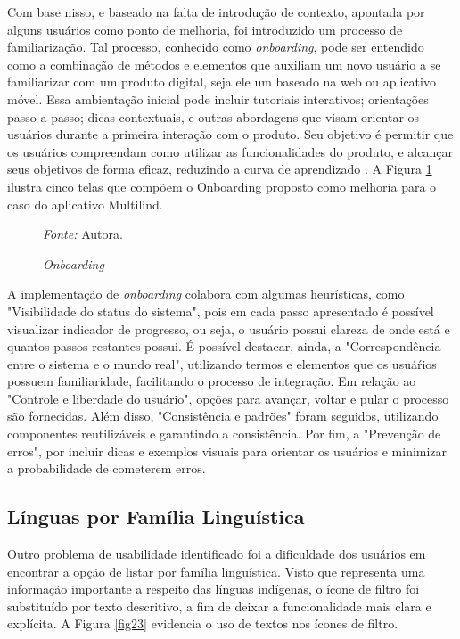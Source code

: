 Com base nisso, e baseado na falta de introdução de contexto, apontada por alguns usuários como ponto de 
melhoria, foi introduzido um processo de familiarização. Tal processo, conhecido como \textit{onboarding}, pode ser entendido como a combinação de métodos e elementos que auxiliam um novo usuário 
a se familiarizar com um produto digital, seja ele um baseado na web ou aplicativo móvel. Essa ambientação inicial pode incluir tutoriais interativos; orientações passo a passo; dicas contextuais, e outras 
abordagens que visam orientar os usuários durante a primeira interação com o produto. Seu objetivo é permitir que os usuários compreendam como utilizar as funcionalidades do produto, e alcançar seus 
objetivos de forma eficaz, reduzindo a curva de aprendizado \cite{renz2014}. A Figura \ref{fig22} ilustra cinco telas que compõem o Onboarding proposto como melhoria para o caso do aplicativo Multilind.

\begin{figure}[h!]
	\centering
	\caption{\textit{Onboarding}}
	\begin{tablenotes}[flushleft]
		\centering
		\item \textit{Fonte:} Autora.
	\end{tablenotes}
	\label{fig22}
\end{figure}

A implementação de \textit{onboarding} colabora com algumas heurísticas, como "Visibilidade do status do sistema", pois em cada passo apresentado é possível visualizar indicador de progresso, ou seja, 
o usuário possui clareza de onde está e quantos passos restantes possui. É possível destacar, ainda, a "Correspondência entre o sistema e o mundo real", utilizando termos e elementos que os usuáŕios 
possuem familiaridade, facilitando o processo de integração. Em relação ao "Controle e liberdade do usuário", opções para avançar, voltar e pular o processo são fornecidas. Além disso, "Consistência e 
padrões" foram seguidos, utilizando componentes reutilizáveis e garantindo a consistência. Por fim, a "Prevenção de erros", por incluir dicas e exemplos visuais para orientar os usuários e  minimizar 
a probabilidade de cometerem erros.

\subsection{Línguas por Família Linguística}
\label{sec:Familia Linguistica}
Outro problema de usabilidade identificado foi a dificuldade dos usuários em encontrar a opção de listar por família linguística. Visto que representa uma informação importante a respeito das línguas indígenas, 
o ícone de filtro foi substituído por texto descritivo, a fim de deixar a funcionalidade mais clara e  explícita. A Figura \ref{fig23} evidencia o uso de textos nos ícones de filtro.

